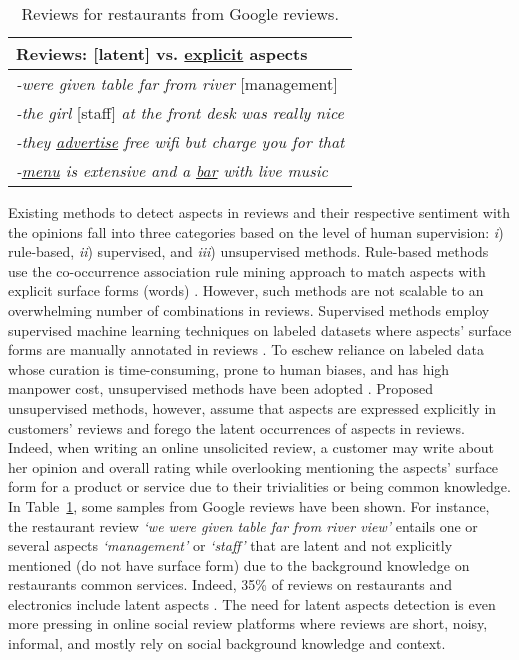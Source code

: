 \documentclass[11pt]{article}
\begin{document}
\begin{table}
\centering
\begin{tabular}{@{}l}
\hline
\textbf{Reviews: [{\color{gray}latent}] vs. {\color{blue}\underline{explicit}} aspects} \\
\hline
\textit{-were given table far from river }[{\color{gray}management}] \\
\textit{-the girl} [{\color{gray}staff}] \textit{at the front desk was really nice} \\
\textit{-they {\color{blue}\underline{advertise}} free wifi but charge you for that}\\ 
\textit{-{\color{blue}\underline{menu}} is extensive and a {\color{blue}\underline{bar}} with live music} \\
\hline
\end{tabular}
\caption{Reviews for restaurants from Google reviews.
}\label{examples-hidden-explicit}
\end{table}

Existing methods to detect aspects in reviews and their respective sentiment with the opinions fall into three categories based on the level of human supervision: \textit{i}) rule-based, \textit{ii}) supervised, and \textit{iii}) unsupervised methods. Rule-based methods use the co-occurrence association rule mining approach to match aspects with explicit surface forms (words) \cite{Hai_2011, Zeng_2013}. However, such methods are not scalable to an overwhelming number of combinations in reviews. Supervised methods employ supervised machine learning techniques on labeled datasets where aspects' surface forms are manually annotated in reviews \cite{Peng_2020, Zhang_2020}. To eschew reliance on labeled data whose curation is time-consuming, prone to human biases, and has high manpower cost, unsupervised methods have been adopted \cite{He_2017, Zong_2021}. Proposed unsupervised methods, however, assume that aspects are expressed explicitly in customers' reviews and forego the latent occurrences of aspects in reviews. Indeed, when writing an online unsolicited review, a customer may write about her opinion and overall rating while overlooking mentioning the aspects' surface form for a product or service due to their trivialities or being common knowledge. In Table~\ref{examples-hidden-explicit}, some samples from Google reviews have been shown. For instance, the restaurant review \textit{`we were given table far from river view'} entails one or several aspects \textit{`management'} or \textit{`staff'} that are latent and not explicitly mentioned (do not have surface form) due to the background knowledge on restaurants common services. Indeed, 35\% of reviews on restaurants and electronics include latent aspects \cite{Cai_2021,Xu_2015}. The need for latent aspects detection is even more pressing in online social review platforms where reviews are short, noisy, informal, and mostly rely on social background knowledge and context.
\end{document}
